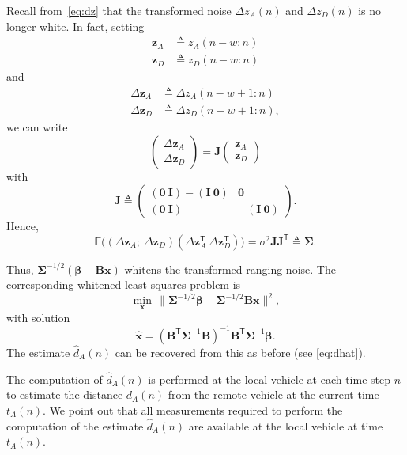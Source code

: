 \documentclass[12pt,journal,final,onecolumn]{IEEEtran}
\newcommand{\msf}[1]{\mathsf{#1}}
\newcommand{\defeq}{\mathrel{\triangleq}}
\newcommand{\E}{\mathbb{E}}
\newcommand{\norm}[1]{\lVert{#1}\rVert}
\newcommand{\T}{\msf{T}}
\theoremstyle{definition}
\theoremstyle{myremark}
\begin{document}
Recall from~\eqref{eq:dz} that the transformed noise $\Delta z_A(n)$ and $\Delta
z_D(n)$ is no longer white. In fact, setting
\begin{align*}
    \bm{z}_A & \defeq z_A(n-w:n) \\
    \bm{z}_D & \defeq z_D(n-w:n)
\end{align*}
and
\begin{align*}
    \Delta\bm{z}_A & \defeq \Delta z_A(n-w+1:n) \\
    \Delta\bm{z}_D & \defeq \Delta z_D(n-w+1:n),
\end{align*}
we can write
\begin{equation*}
    \begin{pmatrix}
        \Delta\bm{z}_A \\
        \Delta\bm{z}_D 
    \end{pmatrix}
    = \bm{J} 
    \begin{pmatrix}
        \bm{z}_A \\
        \bm{z}_D 
    \end{pmatrix}
\end{equation*}
with
\begin{equation*}
    \bm{J} \defeq
    \begin{pmatrix}
        (\bm{0}\ \bm{I})-(\bm{I}\ \bm{0}) & \bm{0} \\
        (\bm{0}\ \bm{I}) & -(\bm{I}\ \bm{0})
    \end{pmatrix}.
\end{equation*}
Hence,
\begin{equation*}
    \E\bigl( 
        (\Delta\bm{z}_A;\ \Delta\bm{z}_D)
        (\Delta\bm{z}_A^\T\ \Delta\bm{z}_D^\T)
    \bigr)
    = \sigma^2 \bm{J}\bm{J}^\T
    \defeq \bm{\Sigma}.
\end{equation*}

Thus, $\bm{\Sigma}^{-1/2}(\bm{\beta}-\bm{B}\bm{x})$ whitens the transformed ranging noise. The
corresponding whitened least-squares problem is
\begin{equation}
    \label{eq:min}
    \min_{\bm{x}}\, \norm{\bm{\Sigma}^{-1/2}\bm{\beta}-\bm{\Sigma}^{-1/2}\bm{B}\bm{x}}^2,
\end{equation}
with solution
\begin{equation*}
    \hat{\bm{x}} 
    = (\bm{B}^\T\bm{\Sigma}^{-1}\bm{B})^{-1}\bm{B}^\T\bm{\Sigma}^{-1}\bm{\beta}.
\end{equation*}
The estimate $\hat{d}_A(n)$ can be recovered from this as before (see
\eqref{eq:dhat}).

The computation of $\hat{d}_A(n)$ is performed at the local vehicle at each
time step $n$ to estimate the distance $d_A(n)$ from the remote vehicle
at the current time $t_A(n)$. We point out that all measurements required to
perform the computation of the estimate $\hat{d}_A(n)$ are available at the
local vehicle at time $t_A(n)$. 
\end{document}
